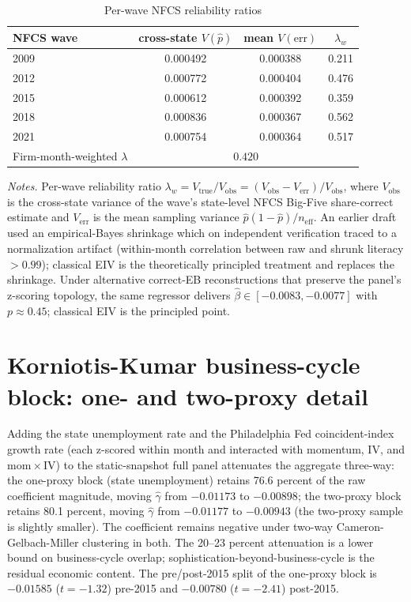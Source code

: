 \documentclass[12pt]{article}
\begin{document}
\begin{table}[h]
\centering
\caption{Per-wave NFCS reliability ratios}
\label{tab:eiv_ia}
\footnotesize
\begin{tabular}{lccc}
\toprule
NFCS wave & cross-state $V(\hat p)$ & mean $V(\text{err})$ & $\lambda_{w}$ \\
\midrule
2009 & 0.000492 & 0.000388 & 0.211 \\
2012 & 0.000772 & 0.000404 & 0.476 \\
2015 & 0.000612 & 0.000392 & 0.359 \\
2018 & 0.000836 & 0.000367 & 0.562 \\
2021 & 0.000754 & 0.000364 & 0.517 \\
\midrule
Firm-month-weighted $\lambda$ & \multicolumn{3}{c}{$0.420$} \\
\bottomrule
\end{tabular}

\medskip
{\footnotesize\textit{Notes.} Per-wave reliability ratio $\lambda_{w} = V_{\text{true}}/V_{\text{obs}} = (V_{\text{obs}} - V_{\text{err}})/V_{\text{obs}}$, where $V_{\text{obs}}$ is the cross-state variance of the wave's state-level NFCS Big-Five share-correct estimate and $V_{\text{err}}$ is the mean sampling variance $\hat p(1-\hat p)/n_{\text{eff}}$. An earlier draft used an empirical-Bayes shrinkage which on independent verification traced to a normalization artifact (within-month correlation between raw and shrunk literacy $> 0.99$); classical EIV is the theoretically principled treatment and replaces the shrinkage. Under alternative correct-EB reconstructions that preserve the panel's z-scoring topology, the same regressor delivers $\hat\beta \in [-0.0083, -0.0077]$ with $p \approx 0.45$; classical EIV is the principled point.}
\end{table}

\section{Korniotis-Kumar business-cycle block: one- and two-proxy detail}
\label{ia:kk}

Adding the state unemployment rate and the Philadelphia Fed coincident-index growth rate (each z-scored within month and interacted with momentum, IV, and $\mathrm{mom}\times\mathrm{IV}$) to the static-snapshot full panel attenuates the aggregate three-way: the one-proxy block (state unemployment) retains 76.6 percent of the raw coefficient magnitude, moving $\hat\gamma$ from $-0.01173$ to $-0.00898$; the two-proxy block retains 80.1 percent, moving $\hat\gamma$ from $-0.01177$ to $-0.00943$ (the two-proxy sample is slightly smaller). The coefficient remains negative under two-way Cameron-Gelbach-Miller clustering in both. The 20--23 percent attenuation is a lower bound on business-cycle overlap; sophistication-beyond-business-cycle is the residual economic content. The pre/post-2015 split of the one-proxy block is $-0.01585$ ($t = -1.32$) pre-2015 and $-0.00780$ ($t = -2.41$) post-2015.
\end{document}
